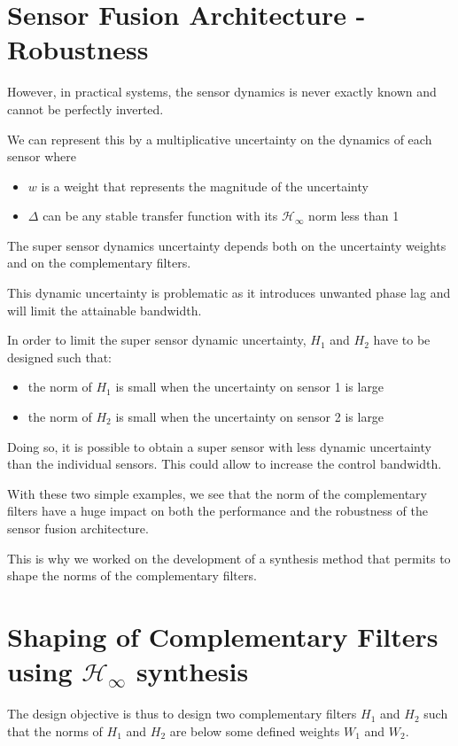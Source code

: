 \documentclass[hangsection=false, titlepage=false, tocnp=false]{cleanreport}
\begin{document}
\section{Sensor Fusion Architecture - Robustness}
\label{sec:org75a0990}
However, in practical systems, the sensor dynamics is never exactly known and cannot be perfectly inverted.

We can represent this by a multiplicative uncertainty on the dynamics of each sensor where
\begin{itemize}
\item \(w\) is a weight that represents the magnitude of the uncertainty
\item \(\Delta\) can be any stable transfer function with its \(\mathcal{H}_\infty\) norm less than 1
\end{itemize}

The super sensor dynamics uncertainty depends both on the uncertainty weights and on the complementary filters.

This dynamic uncertainty is problematic as it introduces unwanted phase lag and will limit the attainable bandwidth.

In order to limit the super sensor dynamic uncertainty, \(H_1\) and \(H_2\) have to be designed such that:
\begin{itemize}
\item the norm of \(H_1\) is small when the uncertainty on sensor 1 is large
\item the norm of \(H_2\) is small when the uncertainty on sensor 2 is large
\end{itemize}

Doing so, it is possible to obtain a super sensor with less dynamic uncertainty than the individual sensors.
This could allow to increase the control bandwidth.

With these two simple examples, we see that the norm of the complementary filters have a huge impact on both the performance and the robustness of the sensor fusion architecture.

This is why we worked on the development of a synthesis method that permits to shape the norms of the complementary filters.

\section{Shaping of Complementary Filters using \(\mathcal{H}_\infty\) synthesis}
\label{sec:org4d70a51}
The design objective is thus to design two complementary filters \(H_1\) and \(H_2\) such that the norms of \(H_1\) and \(H_2\) are below some defined weights \(W_1\) and \(W_2\).
\end{document}
